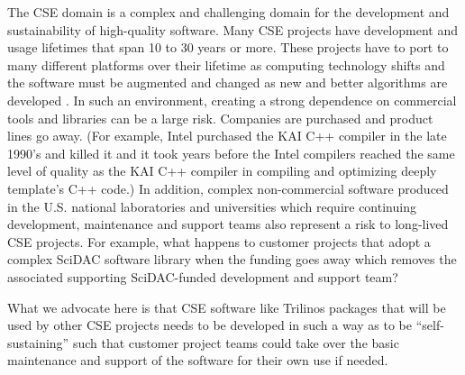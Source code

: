 \documentclass[11pt]{SANDreport}
\begin{document}
The CSE domain is a complex and challenging domain for the development
and sustainability of high-quality software.  Many CSE projects have
development and usage lifetimes that span 10 to 30 years or more.
These projects have to port to many different platforms over their
lifetime as computing technology shifts and the software must be
augmented and changed as new and better algorithms are developed
{}\cite{HPCNeedsAToolsStrategy05}.  In such an environment, creating a
strong dependence on commercial tools and libraries can be a large
risk.  Companies are purchased and product lines go away.  (For
example, Intel purchased the KAI C++ compiler in the late 1990's and
killed it and it took years before the Intel compilers reached the
same level of quality as the KAI C++ compiler in compiling and
optimizing deeply template's C++ code.)  In addition, complex
non-commercial software produced in the U.S. national laboratories and
universities which require continuing development, maintenance and
support teams also represent a risk to long-lived CSE projects.  For
example, what happens to customer projects that adopt a complex SciDAC
software library when the funding goes away which removes the
associated supporting SciDAC-funded development and support team?

What we advocate here is that CSE software like Trilinos packages that
will be used by other CSE projects needs to be developed in such a way
as to be ``self-sustaining'' such that customer project teams could
take over the basic maintenance and support of the software for their
own use if needed.
\end{document}
